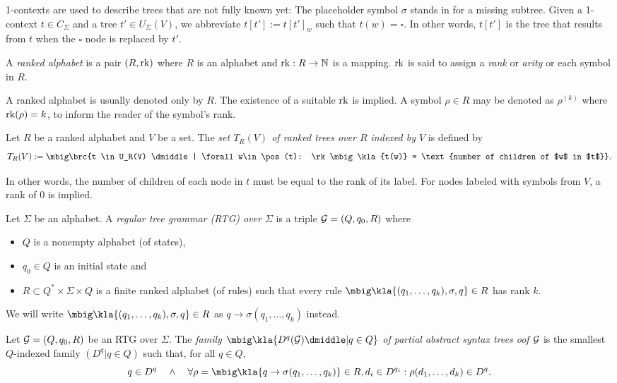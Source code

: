 1-contexts are used to describe trees that are not fully known yet: The
placeholder symbol $\sigma$ stands in for a missing subtree. Given a 1-context
$t\in C_\Sigma$ and a tree $t'\in U_\Sigma(V)$, we abbreviate $t[t'] :=
t[t']_w$ such that $t(w) = \square$. In other words, $t[t']$ is the tree that
results from $t$ when the $\square$ node is replaced by $t'$.

\begin{definition}
 A \emph{ranked alphabet} is a pair $(R,\operatorname{rk})$ where $R$ is an alphabet and
 $\operatorname{rk}:R\to\mathbb N$ is a mapping. $\operatorname{rk}$ is said to assign a \emph{rank} or
 \emph{arity} or each symbol in $R$.
\end{definition}

A ranked alphabet is usually denoted only by $R$. The existence of a suitable
$\operatorname{rk}$ is implied. A symbol $\rho\in R$ may be denoted as $\rho^{(k)}$ where
$\operatorname{rk}(\rho) = k$, to inform the reader of the symbol's rank.

\begin{definition}
 Let $R$ be a ranked alphabet and $V$ be a set. The \emph{set $T_R(V)$ of
 ranked trees over $R$ indexed by $V$} is defined by
 \[
  T_R(V) := \mbig\brc{t \in U_R(V) \dmiddle| \forall w\in\pos(t): \rk\mbig\kla{t(w)} = \text{number of children of $w$ in $t$}}.
 \]
\end{definition}

In other words, the number of children of each node in $t$ must be equal to the
rank of its label. For nodes labeled with symbols from $V$, a rank of 0 is
implied.

\begin{definition}
 Let $\Sigma$ be an alphabet. A \emph{regular tree grammar (RTG) over $\Sigma$} is a
 triple $\mathcal G = (Q,q_0,R)$ where
 \begin{itemize}\setlength\itemsep{-0.3em}
  \item $Q$ is a nonempty alphabet (of states),
  \item $q_0\in Q$ is an initial state and
  \item $R\subset Q^*\times\Sigma\times Q$ is a finite ranked alphabet (of
   rules) such that every rule $\mbig\kla{(q_1,\ldots,q_k),\sigma,q}\in R$ has
   rank $k$.
 \end{itemize}
\end{definition}

We will write $\mbig\kla{(q_1,\ldots,q_k),\sigma,q}\in R$ as $q\to\sigma(q_1,\ldots,q_k)$ instead.

\begin{definition}
 Let $\mathcal G=(Q,q_0,R)$ be an RTG over $\Sigma$. The \emph{family
 $\mbig\kla{D^q(\ug)\dmiddle|q\in Q}$ of partial abstract syntax trees oof
 $\mathcal G$} is the smallest $Q$-indexed family $(D^q|q\in Q)$ such that, for all
 $q\in Q$,
 \[
  q \in D^q \quad\wedge\quad \forall \rho=\mbig\kla{q\to\sigma(q_1,\ldots,q_k)}\in R,d_i\in D^{q_i}: \rho(d_1,\ldots,d_k) \in D^q.
 \]
\end{definition}


